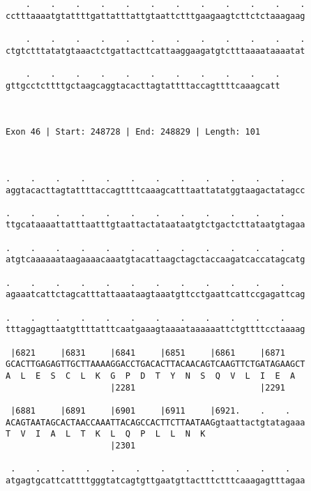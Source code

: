 \documentclass{article}
\begin{document}
\begin{Verbatim}
    .    .    .    .    .    .    .    .    .    .    .    .
cctttaaaatgtattttgattatttattgtaattctttgaagaagtcttctctaaagaag
                                                            
    .    .    .    .    .    .    .    .    .    .    .    .
ctgtctttatatgtaaactctgattacttcattaaggaagatgtctttaaaataaaatat
                                                            
    .    .    .    .    .    .    .    .    .    .    .
gttgcctcttttgctaagcaggtacacttagtattttaccagttttcaaagcatt
                                                       
                                                       
 
Exon 46 | Start: 248728 | End: 248829 | Length: 101



.    .    .    .    .    .    .    .    .    .    .    .    
aggtacacttagtattttaccagttttcaaagcatttaattatatggtaagactatagcc
                                                            
.    .    .    .    .    .    .    .    .    .    .    .    
ttgcataaaattatttaatttgtaattactataataatgtctgactcttataatgtagaa
                                                            
.    .    .    .    .    .    .    .    .    .    .    .    
atgtcaaaaaataagaaaacaaatgtacattaagctagctaccaagatcaccatagcatg
                                                            
.    .    .    .    .    .    .    .    .    .    .    .    
agaaatcattctagcatttattaaataagtaaatgttcctgaattcattccgagattcag
                                                            
.    .    .    .    .    .    .    .    .    .    .    .    
tttaggagttaatgttttatttcaatgaaagtaaaataaaaaattctgttttcctaaaag
                                                            
 |6821     |6831     |6841     |6851     |6861     |6871    
GCACTTGAGAGTTGCTTAAAAGGACCTGACACTTACAACAGTCAAGTTCTGATAGAAGCT
A  L  E  S  C  L  K  G  P  D  T  Y  N  S  Q  V  L  I  E  A  
                     |2281                         |2291    
  
 |6881     |6891     |6901     |6911     |6921.    .    .   
ACAGTAATAGCACTAACCAAATTACAGCCACTTCTTAATAAGgtaattactgtatagaaa
T  V  I  A  L  T  K  L  Q  P  L  L  N  K                    
                     |2301                                  
  
 .    .    .    .    .    .    .    .    .    .    .    .   
atgagtgcattcattttgggtatcagtgttgaatgttactttctttcaaagagtttagaa
                                                            

\end{Verbatim}
\end{document}
